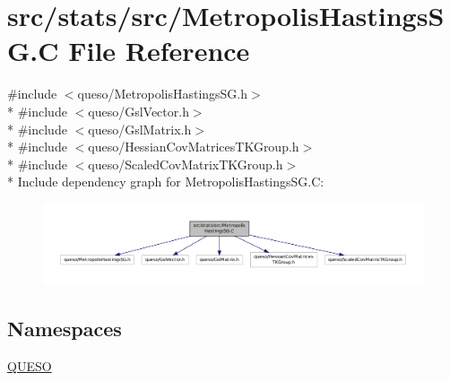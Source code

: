 \hypertarget{_metropolis_hastings_s_g_8_c}{\section{src/stats/src/\-Metropolis\-Hastings\-S\-G.C File Reference}
\label{_metropolis_hastings_s_g_8_c}
}
{\ttfamily \#include $<$queso/\-Metropolis\-Hastings\-S\-G.\-h$>$}\\*
{\ttfamily \#include $<$queso/\-Gsl\-Vector.\-h$>$}\\*
{\ttfamily \#include $<$queso/\-Gsl\-Matrix.\-h$>$}\\*
{\ttfamily \#include $<$queso/\-Hessian\-Cov\-Matrices\-T\-K\-Group.\-h$>$}\\*
{\ttfamily \#include $<$queso/\-Scaled\-Cov\-Matrix\-T\-K\-Group.\-h$>$}\\*
Include dependency graph for Metropolis\-Hastings\-S\-G.\-C\-:
\nopagebreak
\begin{figure}[H]
\begin{center}
\leavevmode
\includegraphics[width=350pt]{_metropolis_hastings_s_g_8_c__incl}
\end{center}
\end{figure}
\subsection*{Namespaces}
\begin{DoxyCompactItemize}
\item 
\hyperlink{namespace_q_u_e_s_o}{Q\-U\-E\-S\-O}
\end{DoxyCompactItemize}
